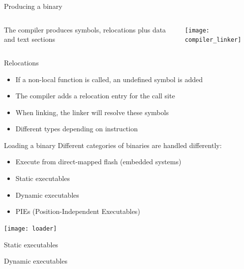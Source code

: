 \documentclass{beamer}
\begin{document}
\begin{frame}{Producing a binary}
  \begin{columns}
    \begin{column}{0.5\textwidth}
      The compiler produces symbols, relocations plus data and text sections
    \end{column}
    \begin{column}{0.5\textwidth}
      \texttt{[image: compiler\_linker]}
    \end{column}
  \end{columns}
\end{frame}

\begin{frame}{Relocations}
  \begin{itemize}
    \item If a non-local function is called, an undefined symbol is added
    \item The compiler adds a relocation entry for the call site
    \item When linking, the linker will resolve these symbols
    \item Different types depending on instruction
  \end{itemize}

\end{frame}

\begin{frame}{Loading a binary}
  Different categories of binaries are handled differently:
  \begin{itemize}
    \item Execute from direct-mapped flash (embedded systems)
    \item Static executables
    \item Dynamic executables
    \item PIEs (Position-Independent Executables)
  \end{itemize}

  \texttt{[image: loader]}
\end{frame}

\begin{frame}{Static executables}

\end{frame}

\begin{frame}{Dynamic executables}
\end{frame}
\end{document}
